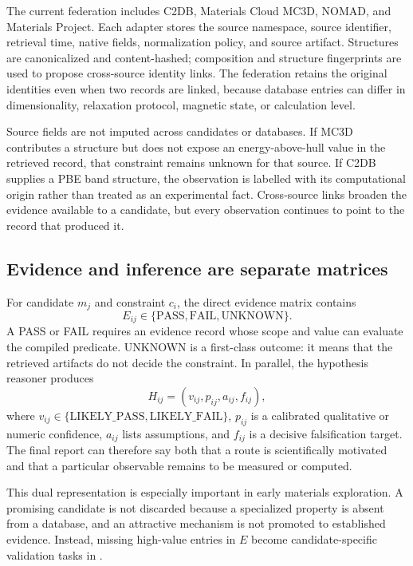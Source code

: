 The current federation includes C2DB, Materials Cloud MC3D, NOMAD, and Materials Project.  Each adapter stores the source namespace, source identifier, retrieval time, native fields, normalization policy, and source artifact.  Structures are canonicalized and content-hashed; composition and structure fingerprints are used to propose cross-source identity links.  The federation retains the original identities even when two records are linked, because database entries can differ in dimensionality, relaxation protocol, magnetic state, or calculation level.

Source fields are not imputed across candidates or databases.  If MC3D contributes a structure but does not expose an energy-above-hull value in the retrieved record, that constraint remains unknown for that source.  If C2DB supplies a PBE band structure, the observation is labelled with its computational origin rather than treated as an experimental fact.  Cross-source links broaden the evidence available to a candidate, but every observation continues to point to the record that produced it.

\subsection{Evidence and inference are separate matrices}

For candidate $m_j$ and constraint $c_i$, the direct evidence matrix contains
\begin{equation}
    E_{ij}\in\{\mathrm{PASS},\mathrm{FAIL},\mathrm{UNKNOWN}\}.
\end{equation}
A PASS or FAIL requires an evidence record whose scope and value can evaluate the compiled predicate.  UNKNOWN is a first-class outcome: it means that the retrieved artifacts do not decide the constraint.  In parallel, the hypothesis reasoner produces
\begin{equation}
    H_{ij}=(v_{ij},p_{ij},a_{ij},f_{ij}),
\end{equation}
where $v_{ij}\in\{\mathrm{LIKELY\_PASS},\mathrm{LIKELY\_FAIL}\}$, $p_{ij}$ is a calibrated qualitative or numeric confidence, $a_{ij}$ lists assumptions, and $f_{ij}$ is a decisive falsification target.  The final report can therefore say both that a route is scientifically motivated and that a particular observable remains to be measured or computed.

This dual representation is especially important in early materials exploration.  A promising candidate is not discarded because a specialized property is absent from a database, and an attractive mechanism is not promoted to established evidence.  Instead, missing high-value entries in $E$ become candidate-specific validation tasks in \matdag.

